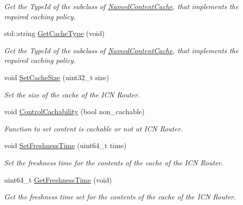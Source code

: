 \begin{DoxyCompactItemize}
\begin{DoxyCompactList}\small\item\em Get the Type\-Id of the subclass of \hyperlink{classns3_1_1NamedContentCache}{Named\-Content\-Cache}, that implements the required caching policy. \end{DoxyCompactList}\item 
std\-::string \hyperlink{classns3_1_1RouterStackHelper_a40b9a37ad83851c7949451589a422d16}{Get\-Cache\-Type} (void)
\begin{DoxyCompactList}\small\item\em Get the Type\-Id of the subclass of \hyperlink{classns3_1_1NamedContentCache}{Named\-Content\-Cache}, that implements the required caching policy. \end{DoxyCompactList}\item 
void \hyperlink{classns3_1_1RouterStackHelper_abad859db7b5bee7d1c4be9201a7972a8}{Set\-Cache\-Size} (uint32\-\_\-t size)
\begin{DoxyCompactList}\small\item\em Set the size of the cache of the I\-C\-N Router. \end{DoxyCompactList}\item 
void \hyperlink{classns3_1_1RouterStackHelper_a22e495a52aa107933c359eab17b8596f}{Control\-Cachability} (bool non\-\_\-cachable)
\begin{DoxyCompactList}\small\item\em Function to set content is cachable or not at I\-C\-N Router. \end{DoxyCompactList}\item 
void \hyperlink{classns3_1_1RouterStackHelper_a429a9b77f6b21301088125b4832a9cbf}{Set\-Freshness\-Time} (uint64\-\_\-t time)
\begin{DoxyCompactList}\small\item\em Set the freshness time for the contents of the cache of the I\-C\-N Router. \end{DoxyCompactList}\item 
uint64\-\_\-t \hyperlink{classns3_1_1RouterStackHelper_a6da6ab4e527893908dd351789230f03a}{Get\-Freshness\-Time} (void)
\begin{DoxyCompactList}\small\item\em Get the freshness time set for the contents of the cache of the I\-C\-N Router. \end{DoxyCompactList}\end{DoxyCompactItemize}
